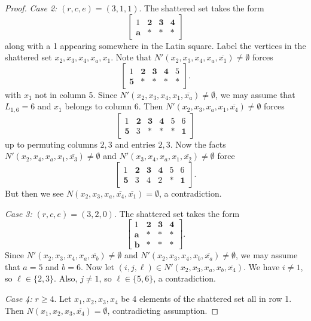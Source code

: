 \documentclass{article}
\theoremstyle{definition}
\begin{document}
\begin{proof}
    \textit{Case 2:} $(r,c,e)=(3,1,1)$. The shattered set takes the form
    $$\begin{bmatrix}
        1&\textbf{2}&\textbf{3}&\textbf{4}\\
        \textbf{a}&*&*&*
    \end{bmatrix}$$
    along with a 1 appearing somewhere in the Latin square. Label the vertices in the shattered set $x_2,x_3,x_4,x_a,x_1$. Note that $N'(x_2,x_3,x_4,x_a,\overline{x_1})\ne\emptyset$ forces 
    $$\begin{bmatrix}
        1&\textbf{2}&\textbf{3}&\textbf{4}&5\\
        \textbf{5}&*&*&*&*
    \end{bmatrix}.$$
    with $x_1$ not in column 5. Since $N'(x_2,x_3,x_4,x_1,\overline{x_a})\ne\emptyset$, we may assume that $L_{1,6}=6$ and $x_1$ belongs to column 6. Then $N'(x_2,x_3,x_a,x_1,\overline{x_4})\ne\emptyset$ forces
    $$\begin{bmatrix}
        1&\textbf{2}&\textbf{3}&\textbf{4}&5&6\\
        \textbf{5}&3&*&*&*&\textbf{1}
    \end{bmatrix}$$
    up to permuting columns $2,3$ and entries $2,3$. Now the facts $N'(x_2,x_4,x_a,x_1,\overline{x_3})\ne\emptyset$ and $N'(x_3,x_4,x_a,x_1,\overline{x_2})\ne\emptyset$ force
    $$\begin{bmatrix}
        1&\textbf{2}&\textbf{3}&\textbf{4}&5&6\\
        \textbf{5}&3&4&2&*&\textbf{1}
    \end{bmatrix}.$$
    But then we see $N(x_2,x_3,x_a,\overline{x_4},\overline{x_1})=\emptyset$, a contradiction.

    \textit{Case 3:} $(r,c,e)=(3,2,0)$. The shattered set takes the form
    $$\begin{bmatrix}
        1&\textbf{2}&\textbf{3}&\textbf{4}\\
        \textbf{a}&*&*&*\\
        \textbf{b}&*&*&*
    \end{bmatrix}.$$
    Since $N'(x_2,x_3,x_4,x_a,\overline{x_b})\ne\emptyset$ and $N'(x_2,x_3,x_4,x_b,\overline{x_a})\ne\emptyset$, we may assume that $a=5$ and $b=6$. Now let $(i,j,\ell)\in N'(x_2,x_3,x_a,x_b,\overline{x_4})$. We have $i\ne 1$, so $\ell\in\{2,3\}$. Also, $j\ne 1$, so $\ell\in\{5,6\}$, a contradiction.

    \textit{Case 4:} $r\ge 4$. Let $x_1,x_2,x_3,x_4$ be 4 elements of the shattered set all in row 1. Then $N(x_1,x_2,x_3,\overline{x_4})=\emptyset$, contradicting assumption.
\end{proof}
\end{document}
